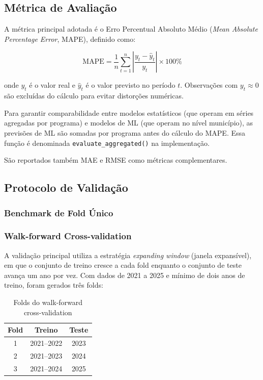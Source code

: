 \documentclass[12pt, a4paper]{article}
\begin{document}
\subsection{Métrica de Avaliação}

A métrica principal adotada é o Erro Percentual Absoluto Médio
(\textit{Mean Absolute Percentage Error}, MAPE), definido como:

\begin{equation}
  \text{MAPE} = \frac{1}{n} \sum_{t=1}^{n}
  \left| \frac{y_t - \hat{y}_t}{y_t} \right| \times 100\%
  \label{eq:mape}
\end{equation}

\noindent onde $y_t$ é o valor real e $\hat{y}_t$ é o valor previsto no
período $t$. Observações com $y_t \approx 0$ são excluídas do cálculo
para evitar distorções numéricas.

Para garantir comparabilidade entre modelos estatísticos (que operam em
séries agregadas por programa) e modelos de ML (que operam no nível
município), as previsões de ML são somadas por programa antes do cálculo
do MAPE. Essa função é denominada \texttt{evaluate\_aggregated()} na
implementação.

São reportados também MAE e RMSE como métricas complementares.

\subsection{Protocolo de Validação}
\label{sec:validacao}

\subsubsection{Benchmark de Fold Único}


\subsubsection{Walk-forward Cross-validation}

A validação principal utiliza a estratégia \textit{expanding window}
(janela expansível), em que o conjunto de treino cresce a cada fold
enquanto o conjunto de teste avança um ano por vez. Com dados de 2021
a 2025 e mínimo de dois anos de treino, foram gerados três folds:

\begin{table}[H]
  \centering
  \caption{Folds do walk-forward cross-validation}
  \label{tab:folds}
  \begin{tabular}{ccc}
    \toprule
    \textbf{Fold} & \textbf{Treino}   & \textbf{Teste} \\
    \midrule
    1             & 2021–2022         & 2023           \\
    2             & 2021–2023         & 2024           \\
    3             & 2021–2024         & 2025           \\
    \bottomrule
  \end{tabular}
\end{table}
\end{document}
